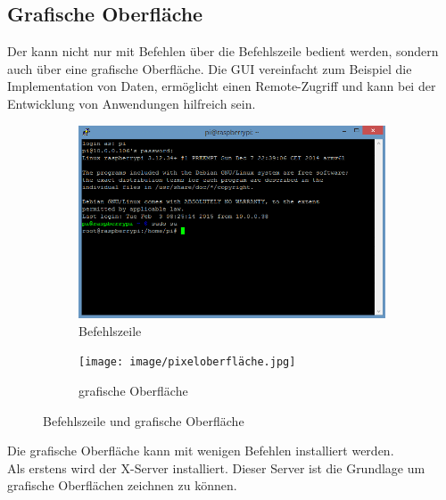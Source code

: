 \subsection{Grafische Oberfläche \raspi}\label{sec:Grafische Oberfläche}
Der \raspi kann nicht nur mit Befehlen über die Befehlszeile bedient werden, sondern auch über eine grafische Oberfläche. Die GUI vereinfacht zum Beispiel die Implementation von Daten, ermöglicht einen Remote-Zugriff und kann bei der Entwicklung von Anwendungen hilfreich sein.\\
\vspace{3mm}
\begin{figure}[htbp]
    \centering
    \begin{subfigure}[b]{0.45\textwidth}
        \centering
        \includegraphics[width=\textwidth]{image/terminal.png}
        \caption{Befehlszeile}
        \label{fig:bild1}
    \end{subfigure}
    \hfill
    \begin{subfigure}[b]{0.5\textwidth}
        \centering
        \texttt{[image: image/pixeloberfläche.jpg]}
        \caption{grafische Oberfläche}
        \label{fig:bild2}
    \end{subfigure}
    \caption{Befehlszeile\autocite{Befehlszeile}  und grafische Oberfläche\autocite{Grafische-Oberfläche}}
    \label{fig:zwei_bilder}
\end{figure}
\vspace{3mm}
Die grafische Oberfläche kann mit wenigen Befehlen installiert werden. \\
Als erstens wird der X-Server installiert. Dieser Server ist die Grundlage um grafische Oberflächen zeichnen zu können.\\
\vspace{3mm}
